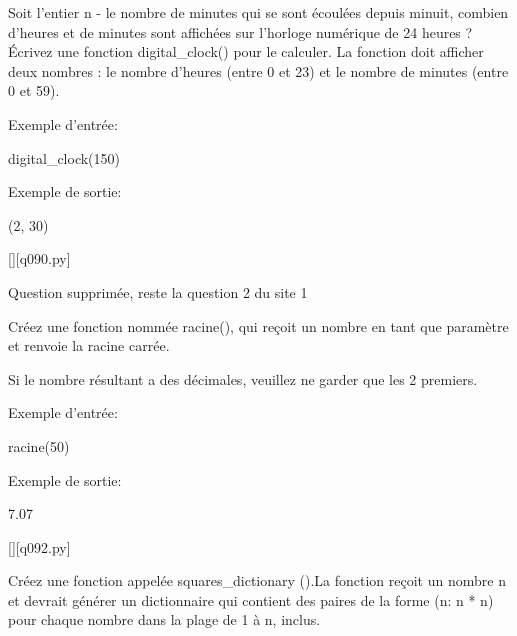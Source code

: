 		\question
		Soit l'entier n - le nombre de minutes qui se sont écoulées depuis minuit, combien d'heures et de minutes sont affichées sur l'horloge numérique de 24 heures ? Écrivez une fonction digital\_clock() pour le calculer. La fonction doit afficher deux nombres : le nombre d'heures (entre 0 et 23) et le nombre de minutes (entre 0 et 59).
		
		Exemple d'entrée:
		
		digital\_clock(150)
		
		Exemple de sortie:
		
		(2, 30)
		\par
		\renewcommand{\nomfichier}{q090.py}
		\begin{solution}
		    \pythonfile{\chemincode \nomfichier}[][\nomfichier]
		\end{solution}
        
\question
Question supprimée, reste la question 2 du site 1
%		
%		
%		
%		
        
		\question
		Créez une fonction nommée racine(), qui reçoit un nombre en tant que paramètre et renvoie la racine carrée.
		
		Si le nombre résultant a des décimales, veuillez ne garder que les 2 premiers.
		
		Exemple d'entrée:
		
		racine(50)
		
		Exemple de sortie:
		
		7.07
		\par
		\renewcommand{\nomfichier}{q092.py}
		\begin{solution}
		    \pythonfile{\chemincode \nomfichier}[][\nomfichier]
		\end{solution}
        
		\question
		Créez une fonction appelée squares\_dictionary ().La fonction reçoit un nombre n et devrait générer un dictionnaire qui contient des paires de la forme (n: n * n) pour chaque nombre dans la plage de 1 à n, inclus.
		
